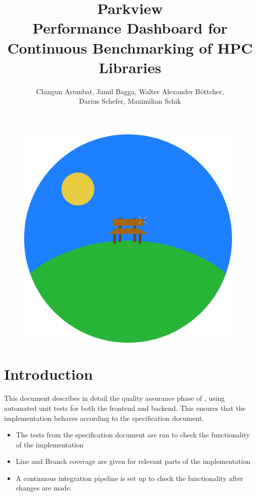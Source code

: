 \documentclass[parskip=full,11pt]{scrartcl}
\title{\Huge Parkview\\
    \LARGE \normalfont Performance Dashboard for Continuous Benchmarking of HPC Libraries}
\author{Chingun Ariunbat, Jamil Bagga, Walter Alexander B\"ottcher,\\Darius Schefer, Maximilian Schik}
\begin{document}
\maketitle
\begin{figure}[h]
	\includegraphics[width=11cm]{parkview.png}
	\centering
\end{figure}

\thispagestyle{empty}

\clearpage
{}

\tableofcontents
\clearpage

\section{Introduction}
This document describes in detail the quality assurance phase of \parkview{}, using automated unit tests for both the frontend and backend. This ensures that the implementation behaves according to the specification document.
\begin{itemize}
  \item The tests from the specification document are ran to check the functionality of the implementation
  \item Line and Branch coverage are given for relevant parts of the implementation
  \item A continuous integration pipeline is set up to check the functionality after changes are made.
\end{itemize}
\clearpage


\clearpage

\appendix

\end{document}
